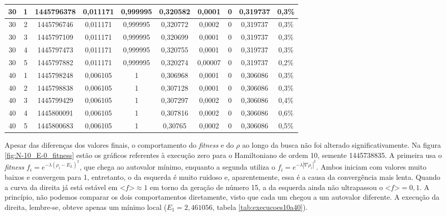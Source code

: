 \begin{landscape}
\begin{center}
\begin{table}[htbp]
\begin{tabular}{cccccccccc}
\hline
        30 &          1 & 1445796378 &   0,011171 &   0,999995 &   0,320582 &     0,0001 &          0 &   0,319737 &      0,3\% \\
\hline
        30 &          2 & 1445796746 &   0,011171 &   0,999995 &   0,320772 &     0,0002 &          0 &   0,319737 &      0,3\% \\
\hline
        30 &          3 & 1445797109 &   0,011171 &   0,999995 &   0,320699 &     0,0001 &          0 &   0,319737 &      0,3\% \\
\hline
        30 &          4 & 1445797473 &   0,011171 &   0,999995 &   0,320755 &     0,0001 &          0 &   0,319737 &      0,3\% \\
\hline
        30 &          5 & 1445797882 &   0,011171 &   0,999995 &   0,320274 &    0,00007 &          0 &   0,319737 &      0,2\% \\
\hline
        40 &          1 & 1445798248 &   0,006105 &          1 &   0,306968 &     0,0001 &          0 &   0,306086 &      0,3\% \\
\hline
        40 &          2 & 1445798838 &   0,006105 &          1 &   0,307128 &     0,0001 &          0 &   0,306086 &      0,3\% \\
\hline
        40 &          3 & 1445799429 &   0,006105 &          1 &   0,307297 &     0,0002 &          0 &   0,306086 &      0,4\% \\
\hline
        40 &          4 & 1445800091 &   0,006105 &          1 &   0,307816 &     0,0002 &          0 &   0,306086 &      0,6\% \\
\hline
        40 &          5 & 1445800683 &   0,006105 &          1 &    0,30765 &     0,0002 &          0 &   0,306086 &      0,5\% \\

\hline \hline
\end{tabular}
\end{table}  
\end{center}
\end{landscape}
	
	Apesar das diferenças dos valores finais, o comportamento do \textit{fitness} e do $\rho$ ao longo da busca não foi alterado significativamente. Na figura \ref{fig:N-10_E-0_fitness} estão os gráficos referentes à execução zero para o Hamiltoniano de ordem 10, semente 1445738835. A primeira usa o \textit{fitness} $f_i = e^{-\lambda(\rho_i - E_L)^2}$, que chega ao autovalor mínimo, enquanto a segunda utiliza o $f_i = e^{-\lambda | \nabla \rho_i |^2}$. Ambos iniciam com valores muito baixos e convergem para 1, entretanto, o da esquerda é muito ruidoso e, aparentemente, essa é a causa da convergência mais lenta. Quando a curva da direita já está estável em $\textit{<f>} \approx 1$ em torno da geração de número 15, a da esquerda ainda não ultrapassou o $\textit{<f>} = 0,1$. A princípio, não podemos comparar os dois comportamentos diretamente, visto que cada um chegou a um autovalor diferente. A execução da direita, lembre-se, obteve apenas um mínimo local ($E_1 = 2,461056$, tabela \ref{tab:execucoes10a40}).
	
